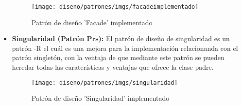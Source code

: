 \begin{itemize}
{	\begin{figure}[h!]
	\centering
		\texttt{[image: diseno/patrones/imgs/facadeimplementado]}
		\caption{Patrón de diseño 'Facade' implementado}
	\end{figure}
	}
	\item{\textbf{Singularidad (Patrón Prs):} El patrón de diseño de singularidad es un patrón -R el cuál es una mejora para la implementación relacionanda con el patrón singletón, con la ventaja de que mediante este patrón se pueden heredar todas las caraterísticas y ventajas que ofrece la clase padre.	
	\begin{figure}[h!]
	\centering
		\texttt{[image: diseno/patrones/imgs/singularidad]}
		\caption{Patrón de diseño 'Singularidad' implementado}
	\end{figure}}
	
	 
\end{itemize}